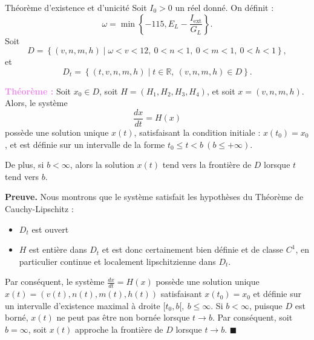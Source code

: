 \documentclass[10pt,french]{beamer}
\begin{document}
	\begin{frame}{Théorème d’existence et d’unicité}
		Soit $I_0 > 0$ un réel donné. On définit :
		\[
		\omega = \min \left\{ -115, E_L -\frac{I_{\text{ext}}}{G_L} \right\}.
		\]
		Soit
		\[
		D = \left\{ (v, n, m, h) \mid \omega < v < 12, \ 0 < n < 1, \ 0 < m < 1, \ 0 < h < 1 \right\},
		\]
		et 
		\[
		D_t = \left\{ (t, v, n, m, h) \mid t \in \mathbb{R}, \ (v, n, m, h) \in D \right\}.
		\]
	\end{frame}
	
	\begin{frame}
		\begin{boxH}
			\textbf{\textcolor{violet}{Théorème :}}
			Soit $x_0 \in D$, soit $H=(H_1, H_2, H_3,H_4)$, et soit $x=(v,n,m,h)$. 
			Alors, le système
			\[
			\frac{dx}{dt}=H(x)
			\]
			possède une solution unique $x(t)$, satisfaisant la condition initiale : $x(t_0) = x_0$, et est définie sur un intervalle de la forme $t_0 \leq t < b 
			~(b \leq +\infty)$.
			
			De plus, si $b < \infty$, alors la solution $x(t)$ tend vers la frontière de $D$ lorsque $t$ tend vers $b$.
		\end{boxH}
	\end{frame}
	
	\begin{frame}
		\textbf{Preuve.} Nous montrons que le système satisfait les hypothèses du Théorème de Cauchy-Lipschitz :
		\begin{itemize}
			\item $D_t$ est ouvert
			\item $H$ est entière dans $D_t$ et est donc certainement bien définie et de classe $C^1$, en particulier continue et localement lipschitzienne dans $D_t$.
		\end{itemize}
		
		Par conséquent, le système $\frac{dx}{dt} = H(x)$ possède une solution unique $x(t) = (v(t), n(t), m(t), h(t))$ satisfaisant $x(t_0) = x_0$ et définie sur un intervalle d'existence maximal à droite $[t_0, b[,~ b \leq \infty$. Si $b < \infty$, puisque $D$ est borné, $x(t)$ ne peut pas être non bornée lorsque $t \to b$. Par conséquent, soit $b = \infty$, soit $x(t)$ approche la frontière de $D$ lorsque $t \to b$. $\blacksquare$
	\end{frame}
	
\end{document}
